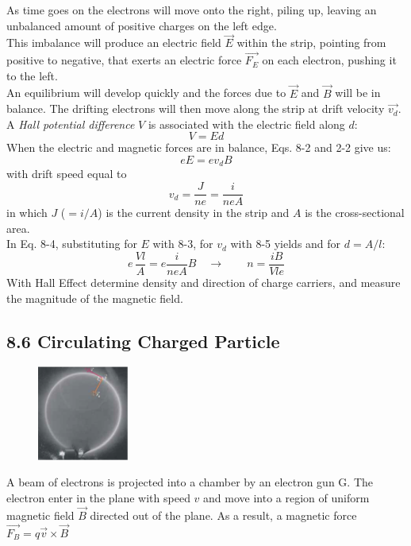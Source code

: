 \documentclass[12pt, a4paper]{article}
\begin{document}
		As time goes on the electrons will move onto the right, piling up, leaving an unbalanced amount of positive charges on the left edge. \\ This imbalance will produce an electric field $\vec{E}$ within the strip, pointing from positive to negative, that exerts an electric force $\vec{F_E}$ on each electron, pushing it to the left. \\ 
		An equilibrium will develop quickly and the forces due to $\vec{E}$ and $\vec{B}$ will be in balance. The drifting electrons will then move along the strip at drift velocity $\vec{v_d}$. \\ 
		A \textit{Hall potential difference} $V$ is associated with the electric field along $d$:
		\[
			V = Ed
			\tag{8-3}
		\]
		When the electric and magnetic forces are in balance, Eqs. 8-2 and 2-2 give us:
		\[
			e E = e v_d B
			\tag{8-4}
		\]
		with drift speed equal to
		\[
			v_d = \frac{J}{ne} = \frac{i}{n e A}
			\tag{8-5}
		\]
		in which $J$ ($= i/A$) is the current density in the strip and $A$ is the cross-sectional area. \\
		In Eq. 8-4, substituting for $E$ with 8-3, for $v_d$ with 8-5 yields and for $d = A / l$:
		\[
			e \, \frac{Vl}{A} = e \frac{i}{neA} B \quad \rightarrow \quad \quad
			n = \frac{iB}{Vle}
			\tag{8-6}
		\]
		With Hall Effect determine density and direction of charge carriers, and measure the magnitude of the magnetic field.
		
		
		
		\subsection*{8.6 Circulating Charged Particle}
		
		\begin{figure}
			\centering
			\includegraphics[width=3cm]{Physics2_PNGs/electron-magn-field.png}
			\caption*{}
			\label{fig:electron-magn-field.png}
		\end{figure}
		A beam of electrons is projected into a chamber by an electron gun G. The electron enter in the plane with speed $v$ and move into a region of uniform magnetic field $\vec{B}$ directed out of the plane. As a result, a magnetic force $\vec{F_B} = q \vec{v} \times \vec{B}$
		
	
	
	

	
\end{document}
